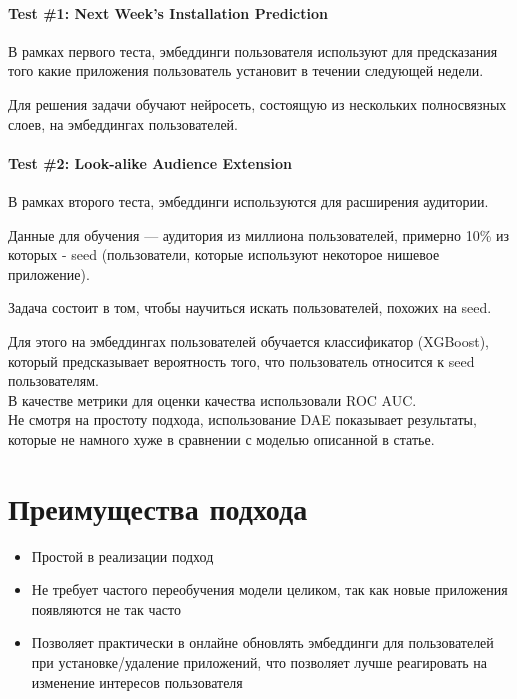 \paragraph{Test \#1: Next Week’s Installation Prediction} В рамках первого теста, эмбеддинги пользователя используют для предсказания того какие приложения пользователь установит в течении следующей недели.

Для решения задачи обучают нейросеть, состоящую из нескольких полносвязных слоев, на эмбеддингах пользователей.

\paragraph{Test \#2: Look-alike Audience Extension} В рамках второго теста, эмбеддинги используются для расширения аудитории.

Данные для обучения --- аудитория из миллиона пользователей, примерно 10\% из которых - seed (пользователи, которые используют некоторое нишевое приложение). 

Задача состоит в том, чтобы научиться искать пользователей, похожих на seed. 

Для этого на эмбеддингах пользователей обучается классификатор (XGBoost), который предсказывает вероятность того, что пользователь относится к seed пользователям. \\

В качестве метрики для оценки качества использовали ROC AUC. \\

Не смотря на простоту подхода, использование DAE показывает результаты, которые не намного хуже в сравнении с моделью описанной в статье.

\section*{Преимущества подхода}

\begin{itemize}
    \item Простой в реализации подход
    \item Не требует частого переобучения модели целиком, так как новые приложения появляются не так часто
    \item Позволяет практически в онлайне обновлять эмбеддинги для пользователей при установке/удаление приложений, что позволяет лучше реагировать на изменение интересов пользователя
\end{itemize}